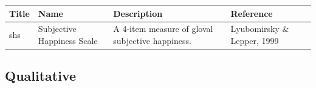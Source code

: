 \documentclass[]{book}
\begin{document}
\begin{longtable}[]{@{}llll@{}}
\toprule
\begin{minipage}[b]{0.22\columnwidth}\raggedright
Title\strut
\end{minipage} & \begin{minipage}[b]{0.27\columnwidth}\raggedright
Name\strut
\end{minipage} & \begin{minipage}[b]{0.22\columnwidth}\raggedright
Description\strut
\end{minipage} & \begin{minipage}[b]{0.18\columnwidth}\raggedright
Reference\strut
\end{minipage}\tabularnewline
\midrule
\endhead
\begin{minipage}[t]{0.22\columnwidth}\raggedright
shs\strut
\end{minipage} & \begin{minipage}[t]{0.27\columnwidth}\raggedright
Subjective Happiness Scale\strut
\end{minipage} & \begin{minipage}[t]{0.22\columnwidth}\raggedright
A 4-item measure of gloval subjective happiness.\strut
\end{minipage} & \begin{minipage}[t]{0.18\columnwidth}\raggedright
Lyubomirsky \& Lepper, 1999\strut
\end{minipage}\tabularnewline
\bottomrule
\end{longtable}

\hypertarget{qualitative}{%
\subsection{Qualitative}\label{qualitative}}
\end{document}
